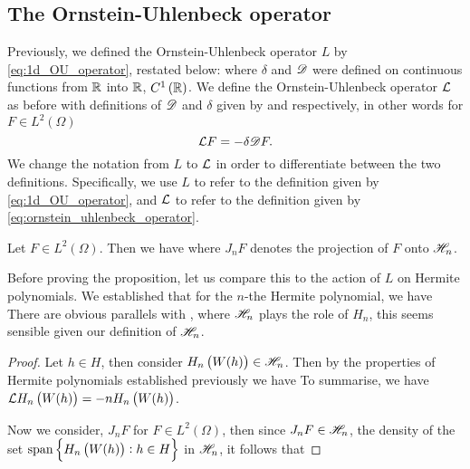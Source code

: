 \documentclass[../main.tex]{subfiles}
\begin{document}
\subsection{The Ornstein-Uhlenbeck operator}
Previously, we defined the Ornstein-Uhlenbeck operator $L$ by \eqref{eq:1d_OU_operator}, restated below:
 where $\delta$ and $\mathscr{D}$ were defined on continuous functions from $\operatorname{\mathbb{R}}$ into $\operatorname{\mathbb{R}}$, $C^1\del{\R}$. We define the Ornstein-Uhlenbeck operator $\mathcal{L}$ as before with definitions of $\mathscr{D}$ and $\delta$ given by  and  respectively, in other words for $F\in L^2(\Omega)$ 
\begin{equation}
    \label{eq:ornstein_uhlenbeck_operator}
    \mathcal{L} F = -\delta\mathscr{D} F.
\end{equation}
We change the notation from $L$ to $\mathcal{L}$ in order to differentiate between the two definitions. Specifically, we use $L$ to refer to the definition given by \eqref{eq:1d_OU_operator}, and $\mathcal{L}$ to refer to the definition given by \eqref{eq:ornstein_uhlenbeck_operator}.
\begin{proposition}
\label{prop:OU_on_Wiener_chaos}
Let $F\in L^2(\Omega)$. Then we have  where $J_nF$ denotes the projection of $F$ onto $\mathscr{H}_n$.
\end{proposition}
Before proving the proposition, let us compare this to the action of $L$ on Hermite polynomials. We established that for the $n$-the Hermite polynomial, we have  There are obvious parallels with , where $\mathscr{H}_n$ plays the role of $H_n$, this seems sensible given our definition of $\mathscr{H}_n$.
\begin{proof}
Let $h\in H$, then consider $H_n\del{W(h)}\in\Wie_n$. Then by the properties of Hermite polynomials established previously we have  To summarise, we have $\L H_n\del{W(h)} = -nH_n\del{W(h)}$.

Now we consider, $J_nF$ for $F\in L^2(\Omega)$, then since $J_nF\in\mathscr{H}_n$, the density of the set \newline $\span\cbr{H_n\del{W(h)}:h\in H}$ in $\mathscr{H}_n$, it follows that 
\end{proof}
\end{document}

